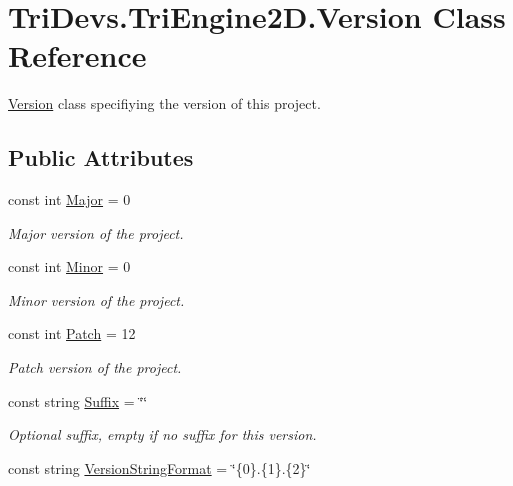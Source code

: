 \hypertarget{class_tri_devs_1_1_tri_engine2_d_1_1_version}{\section{Tri\-Devs.\-Tri\-Engine2\-D.\-Version Class Reference}
\label{class_tri_devs_1_1_tri_engine2_d_1_1_version}
}


\hyperlink{class_tri_devs_1_1_tri_engine2_d_1_1_version}{Version} class specifiying the version of this project.  


\subsection*{Public Attributes}
\begin{DoxyCompactItemize}
\item 
const int \hyperlink{class_tri_devs_1_1_tri_engine2_d_1_1_version_adf7439103e5307870f8a9b953e9f3933}{Major} = 0
\begin{DoxyCompactList}\small\item\em Major version of the project. \end{DoxyCompactList}\item 
const int \hyperlink{class_tri_devs_1_1_tri_engine2_d_1_1_version_a46c99b37d8caad10a9702e9823f6cded}{Minor} = 0
\begin{DoxyCompactList}\small\item\em Minor version of the project. \end{DoxyCompactList}\item 
const int \hyperlink{class_tri_devs_1_1_tri_engine2_d_1_1_version_a5baa982b0404ea5ed3d2526e26f55809}{Patch} = 12
\begin{DoxyCompactList}\small\item\em Patch version of the project. \end{DoxyCompactList}\item 
const string \hyperlink{class_tri_devs_1_1_tri_engine2_d_1_1_version_a5f7a61ae54163decac64e6acbe25e76d}{Suffix} = \char`\"{}\char`\"{}
\begin{DoxyCompactList}\small\item\em Optional suffix, empty if no suffix for this version. \end{DoxyCompactList}\item 
const string \hyperlink{class_tri_devs_1_1_tri_engine2_d_1_1_version_a7ff4d8681e4833ef71067425aac665e4}{Version\-String\-Format} = \char`\"{}\{0\}.\{1\}.\{2\}\char`\"{}

\end{DoxyCompactItemize}
